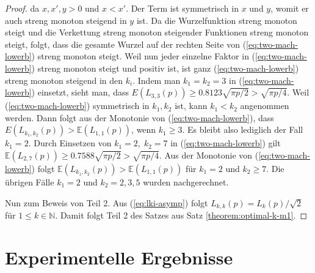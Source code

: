 \documentclass[a4paper, 11pt, ngerman]{article}
\newcommand{\E}{\mathbb{E}}
\newcommand{\N}{\mathbb{N}}
\theoremstyle{definition}
\theoremstyle{plain}
\theoremstyle{remark}
\begin{document}
\begin{proof}
    da $x, x', y > 0$ und $x < x'$. Der Term ist symmetrisch in $x$ und $y$, womit er auch streng monoton steigend in $y$ ist. Da die Wurzelfunktion streng monoton steigt und die Verkettung streng monoton steigender Funktionen streng monoton steigt, folgt, dass die gesamte Wurzel auf der rechten Seite von (\ref{eq:two-mach-lowerb}) streng monoton steigt. Weil nun jeder einzelne Faktor in (\ref{eq:two-mach-lowerb}) streng monoton steigt und positiv ist, ist ganz (\ref{eq:two-mach-lowerb}) streng monoton steigend in den $k_i$. Indem man $k_1 = k_2 = 3$ in (\ref{eq:two-mach-lowerb}) einsetzt, sieht man, dass $E(L_{3, 3}(p)) \ge 0.8123 \sqrt{\pi p /2}  > \sqrt{\pi p / 4}$. Weil (\ref{eq:two-mach-lowerb}) symmetrisch in $k_1, k_2$ ist, kann $k_1 < k_2$ angenommen werden. Dann folgt aus der Monotonie von (\ref{eq:two-mach-lowerb}), dass $E(L_{k_1, k_2}(p)) > \E(L_{1, 1}(p))$, wenn $k_1 \ge 3$. Es bleibt also lediglich der Fall $k_1 = 2$. Durch Einsetzen von $k_1 = 2, \; k_2 = 7$ in (\ref{eq:two-mach-lowerb}) gilt $\E(L_{2, 7}(p)) \ge 0.7588 \sqrt{\pi p / 2} > \sqrt{\pi p / 4}$. Aus der Monotonie von (\ref{eq:two-mach-lowerb}) folgt $\E(L_{k_1, k_2}(p)) > \E(L_{1, 1}(p))$ für $k_1 = 2$ und $k_2 \ge 7$. Die übrigen Fälle $k_1 = 2$ und $k_2 = 2, 3, 5$ wurden nachgerechnet.

    Nun zum Beweis von Teil 2. Aus (\ref{eq:lki-asymp}) folgt $L_{k, k}(p) = L_{k}(p) / \sqrt 2$ für $1 \le k \in \N$. Damit folgt Teil 2 des Satzes aus Satz \ref{theorem:optimal-k-m1}.
\end{proof}

\section{Experimentelle Ergebnisse}
\end{document}
